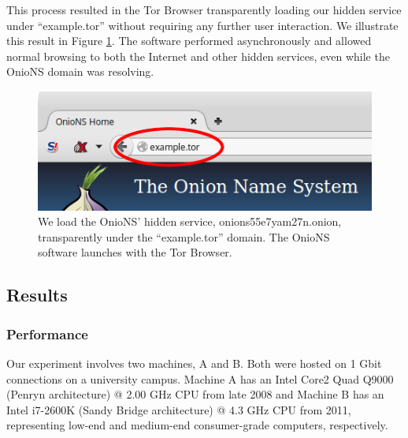 \documentclass[conference]{IEEEtran}
\begin{document}
This process resulted in the Tor Browser transparently loading our hidden service under ``example.tor'' without requiring any further user interaction. We illustrate this result in Figure \ref{fig:prototypeExample}. The software performed asynchronously and allowed normal browsing to both the Internet and other hidden services, even while the OnioNS domain was resolving.


\begin{figure}[h]
	\centering
	\includegraphics[width=\linewidth]{../assets/images/example.png}
	\caption{We load the OnioNS' hidden service, onions55e7yam27n.onion, transparently under the ``example.tor'' domain. The OnioNS software launches with the Tor Browser.}
	\label{fig:prototypeExample}
\end{figure}

\subsection{Results}

\subsubsection{Performance}

Our experiment involves two machines, A and B. Both were hosted on 1 Gbit connections on a university campus. Machine A has an Intel Core2 Quad Q9000 (Penryn architecture) @ 2.00 GHz CPU from late 2008 and Machine B has an Intel i7-2600K (Sandy Bridge architecture) @ 4.3 GHz CPU from 2011, representing low-end and medium-end consumer-grade computers, respectively.
\end{document}
